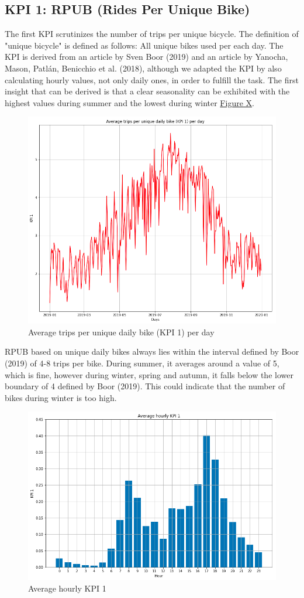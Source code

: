 \subsection{KPI 1: RPUB (Rides Per Unique Bike)}
\label{subsec:KPI1}

The first KPI scrutinizes the number of trips per unique bicycle. The definition of "unique bicycle" is defined as follows: All unique bikes used per each day. The KPI is derived from an article by Sven Boor (2019) and an article by Yanocha, Mason, Patlán, Benicchio et al. (2018), although we adapted the KPI by also calculating hourly values, not only daily ones, in order to fulfill the task. The first insight that can be derived is that a clear seasonality can be exhibited with the highest values during summer and the lowest during winter \hyperref[kpi1abb1]{Figure X}.

\begin{figure}[H]
    \centering
    \includegraphics[width=0.7\linewidth]{./Figures/kpi1abb1.png}
    \caption{Average trips per unique daily bike (KPI 1) per day}
    \label{kpi1abb1}
\end{figure}

RPUB based on unique daily bikes always lies within the interval defined by Boor (2019) of 4-8 trips per bike. During summer, it averages around a value of 5, which is fine, however during winter, spring and autumn, it falls below the lower boundary of 4 defined by Boor (2019). This could indicate that the number of bikes during winter is too high.

\begin{figure}[H]
   \centering
    \includegraphics[width=0.7\linewidth]{./Figures/kpi1abb3.png}
    \caption{Average hourly KPI 1}
    \label{kpi1abb3}
\end{figure}

